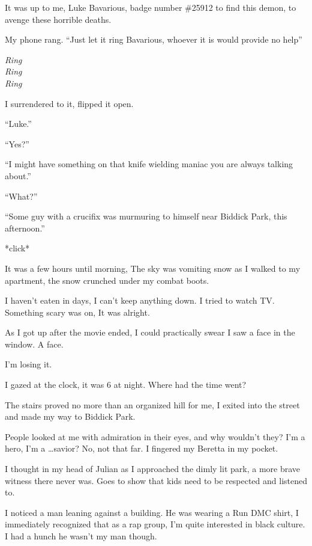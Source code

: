 It was up to me, Luke Bavarious, badge number \#25912 to find this
demon, to avenge these horrible deaths.



My phone rang. ``Just let it ring Bavarious, whoever it is would
provide no help''

{\em Ring} \\
{\em Ring} \\
{\em Ring}

I surrendered to it, flipped it open.



``Luke.''

``Yes?''

``I might have something on that knife wielding maniac you are always
talking about.''

``What?''

``Some guy with a crucifix was murmuring to himself near Biddick
Park, this afternoon.''

*click*



It was a few hours until morning, The sky was vomiting snow as I
walked to my apartment, the snow crunched under my combat
boots.



I haven't eaten in days, I can't keep anything down. I tried to
watch TV. Something scary was on, It was alright.

As I got up after the movie ended, I could practically swear I saw
a face in the window. A face.



I'm losing it.



I gazed at the clock, it was 6 at night. Where had the time
went?



The stairs proved no more than an organized hill for me, I exited
into the street and made my way to Biddick Park.



People looked at me with admiration in their eyes, and why wouldn't
they? I'm a hero, I'm a {\ldots}savior? No, not that far. I fingered my
Beretta in my pocket.



I thought in my head of Julian as I approached the dimly lit park,
a more brave witness there never was. Goes to show that kids need
to be respected and listened to.



I noticed a man leaning against a building. He was wearing a Run
DMC shirt, I immediately recognized that as a rap group, I'm quite
interested in black culture. I had a hunch he wasn't my man
though.



